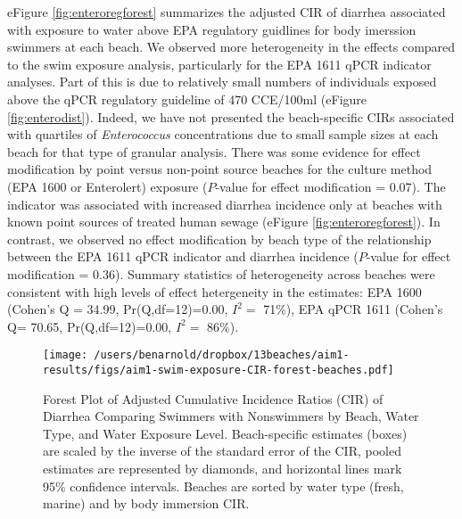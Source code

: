 \documentclass[12pt]{article}\usepackage[]{graphicx}\usepackage[]{color}
\begin{document}
eFigure \ref{fig:enteroregforest} summarizes the adjusted CIR of diarrhea associated with exposure to water above EPA regulatory guidlines for body imerssion swimmers at each beach.  We observed more heterogeneity in the effects compared to the swim exposure analysis, particularly for the EPA 1611 qPCR indicator analyses.  Part of this is due to relatively small numbers of individuals exposed above the qPCR regulatory guideline of 470 CCE/100ml (eFigure \ref{fig:enterodist}). Indeed, we have not presented the beach-specific CIRs associated with quartiles of \emph{Enterococcus} concentrations due to small sample sizes at each beach for that type of granular analysis. There was some evidence for effect modification by point versus non-point source beaches for the culture method (EPA 1600 or Enterolert) exposure ($P$-value for effect modification = 0.07). The indicator was associated with increased diarrhea incidence only at beaches with known point sources of treated human sewage (eFigure \ref{fig:enteroregforest}). In contrast, we observed no effect modification by beach type of the relationship between the EPA 1611 qPCR indicator and diarrhea incidence ($P$-value for effect modification = 0.36). Summary statistics of heterogeneity across beaches\supercite{Higgins2002-vr, Higgins2003-bh} were consistent with high levels of effect hetergeneity in the estimates: EPA 1600 (Cohen's Q =
34.99, 
Pr(Q,df=12)=0.00,
$I^2=$ 71\%),
 EPA qPCR 1611 (Cohen's Q=
 70.65, 
Pr(Q,df=12)=0.00,
$I^2=$ 86\%).

\begin{landscape}
\begin{figure}[h!tb]
\begin{center}
\texttt{[image: /users/benarnold/dropbox/13beaches/aim1-results/figs/aim1-swim-exposure-CIR-forest-beaches.pdf]}
\caption{Forest Plot of Adjusted Cumulative Incidence Ratios (CIR) of Diarrhea Comparing Swimmers with Nonswimmers by Beach, Water Type, and Water Exposure Level. Beach-specific estimates (boxes) are scaled by the inverse of the standard error of the CIR, pooled estimates are represented by diamonds, and horizontal lines mark 95\% confidence intervals. Beaches are sorted by water type (fresh, marine) and by body immersion CIR. \label{fig:swimforest}}
\end{center}
\end{figure}
\end{landscape}
\end{document}
